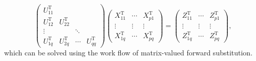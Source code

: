 \documentclass[11pt, a4paper]{book}
\begin{document}
\begin{itemize}
  \begin{equation}
    \begin{pmatrix}
      U^{\mathrm{T}}_{11} & & & \\
      U^{\mathrm{T}}_{12} & U^{\mathrm{T}}_{22} & & \\
      \vdots & & \ddots & \\
      U^{\mathrm{T}}_{1q} & U^{\mathrm{T}}_{2q} & \cdots & U^{\mathrm{T}}_{qq}
    \end{pmatrix}
    \begin{pmatrix}
      X^{\mathrm{T}}_{11} & \cdots & X^{\mathrm{T}}_{p1} \\
      \vdots & \vdots & \vdots \\
      X^{\mathrm{T}}_{1q} & \cdots & X^{\mathrm{T}}_{pq}
    \end{pmatrix} =
    \begin{pmatrix}
      Z^{\mathrm{T}}_{11} & \cdots & Z^{\mathrm{T}}_{p1} \\
      \vdots & \vdots & \vdots \\
      Z^{\mathrm{T}}_{1q} & \cdots & Z^{\mathrm{T}}_{pq}
    \end{pmatrix},
  \end{equation}
  which can be solved using the work flow of matrix-valued forward substitution.
\end{itemize}
\end{document}
